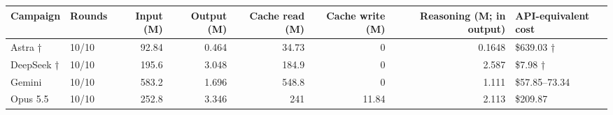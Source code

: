 \begin{tabular}{llrrrrrl}
\toprule
Campaign & Rounds & Input (M) & Output (M) & Cache read (M) & Cache write (M) & Reasoning (M; in output) & API-equivalent cost \\
\midrule
Astra † & 10/10 & 92.84 & 0.464 & 34.73 & 0 & 0.1648 & \$639.03 † \\
DeepSeek † & 10/10 & 195.6 & 3.048 & 184.9 & 0 & 2.587 & \$7.98 † \\
Gemini & 10/10 & 583.2 & 1.696 & 548.8 & 0 & 1.111 & \$57.85–73.34 \\
Opus 5.5 & 10/10 & 252.8 & 3.346 & 241 & 11.84 & 2.113 & \$209.87 \\
\bottomrule
\end{tabular}
